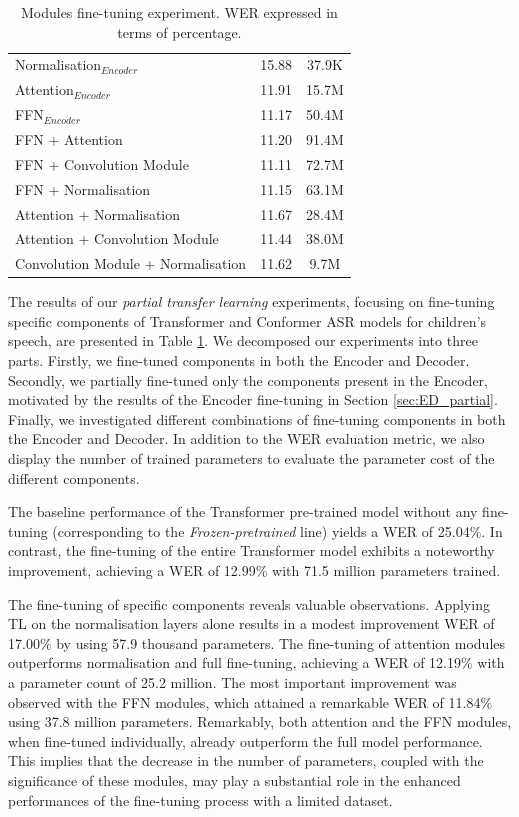\begin{table}[h]
\begin{center}
\begin{tabular}{lcc}
            Normalisation$_{Encoder}$ & 15.88 & 37.9K \\ 
            Attention$_{Encoder}$ & 11.91 & 15.7M \\ 
            FFN$_{Encoder}$ & 11.17 & 50.4M \\ \hline
            FFN + Attention & 11.20 & 91.4M \\
            FFN + Convolution Module & 11.11 & 72.7M \\
            FFN + Normalisation & 11.15 & 63.1M \\
            Attention + Normalisation & 11.67 & 28.4M \\
            Attention + Convolution Module & 11.44 & 38.0M \\
            Convolution Module + Normalisation & 11.62 & 9.7M\\ \hline
        \end{tabular}
    \end{center}
    \caption{Modules fine-tuning experiment. WER expressed in terms of percentage.}
    \label{table:ModulesTL}
\end{table}
The results of our \textit{partial transfer learning} experiments, focusing on fine-tuning specific components of Transformer and Conformer \ac{ASR} models for children's speech, are presented in Table \ref{table:ModulesTL}. We decomposed our experiments into three parts. Firstly, we fine-tuned components in both the Encoder and Decoder. Secondly, we partially fine-tuned only the components present in the Encoder, motivated by the results of the Encoder fine-tuning in Section \ref{sec:ED_partial}. Finally, we investigated different combinations of fine-tuning components in both the Encoder and Decoder. In addition to the \ac{WER} evaluation metric, we also display the number of trained parameters to evaluate the parameter cost of the different components. 

The baseline performance of the Transformer pre-trained model without any fine-tuning (corresponding to the \textit{Frozen-pretrained} line) yields a \ac{WER} of 25.04\%. In contrast, the fine-tuning of the entire Transformer model exhibits a noteworthy improvement, achieving a \ac{WER} of 12.99\% with 71.5 million parameters trained.

The fine-tuning of specific components reveals valuable observations. Applying \ac{TL} on the normalisation layers alone results in a modest improvement \ac{WER} of 17.00\% by using 57.9 thousand parameters. The fine-tuning of attention modules outperforms normalisation and full fine-tuning, achieving a \ac{WER} of 12.19\% with a parameter count of 25.2 million. The most important improvement was observed with the \ac{FFN} modules, which attained a remarkable \ac{WER} of 11.84\% using 37.8 million parameters. Remarkably, both attention and the \ac{FFN} modules, when fine-tuned individually, already outperform the full model performance. This implies that the decrease in the number of parameters, coupled with the significance of these modules, may play a substantial role in the enhanced performances of the fine-tuning process with a limited dataset.

